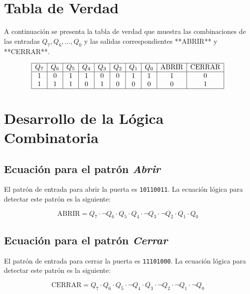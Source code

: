 \documentclass[12pt,letterpaper]{article}
\begin{document}
\section*{Tabla de Verdad}

A continuación se presenta la tabla de verdad que muestra las combinaciones de las entradas \( Q_7, Q_6, \ldots, Q_0 \) y las salidas correspondientes **ABRIR** y **CERRAR**.

\[
\begin{array}{|c|c|c|c|c|c|c|c|c|c|}
\hline
Q_7 & Q_6 & Q_5 & Q_4 & Q_3 & Q_2 & Q_1 & Q_0 & \text{ABRIR} & \text{CERRAR} \\
\hline
1 & 0 & 1 & 1 & 0 & 0 & 1 & 1 & 1 & 0 \\
1 & 1 & 1 & 0 & 1 & 0 & 0 & 0 & 0 & 1 \\
\hline
\end{array}
\]

\section*{Desarrollo de la Lógica Combinatoria}

\subsection*{Ecuación para el patrón \textit{Abrir}}
El patrón de entrada para abrir la puerta es \texttt{10110011}. La ecuación lógica para detectar este patrón es la siguiente:

\[
\text{ABRIR} = Q_7 \cdot \neg Q_6 \cdot Q_5 \cdot Q_4 \cdot \neg Q_3 \cdot \neg Q_2 \cdot Q_1 \cdot Q_0
\]

\subsection*{Ecuación para el patrón \textit{Cerrar}}
El patrón de entrada para cerrar la puerta es \texttt{11101000}. La ecuación lógica para detectar este patrón es la siguiente:

\[
\text{CERRAR} = Q_7 \cdot Q_6 \cdot Q_5 \cdot \neg Q_4 \cdot Q_3 \cdot \neg Q_2 \cdot \neg Q_1 \cdot \neg Q_0
\]
\end{document}
